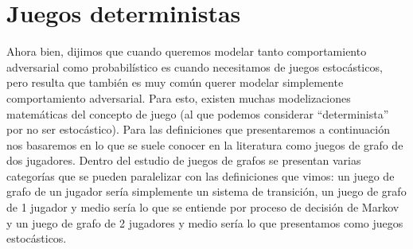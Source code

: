 







\section{Juegos deterministas}

Ahora bien, dijimos que cuando queremos modelar tanto comportamiento
adversarial como probabilístico es cuando necesitamos de juegos estocásticos,
pero resulta que también es muy común querer modelar simplemente comportamiento
adversarial. Para esto, existen muchas modelizaciones matemáticas del concepto
de juego (al que podemos considerar ``determinista'' por no ser estocástico).
Para las definiciones que presentaremos a continuación nos basaremos en lo que
se suele conocer en la literatura como juegos de grafo de dos jugadores. Dentro
del estudio de juegos de grafos se presentan varias categorías que se pueden
paralelizar con las definiciones que vimos: un juego de grafo de un jugador
sería simplemente un sistema de transición, un juego de grafo de 1 jugador y
medio sería lo que se entiende por proceso de decisión de Markov y un juego de
grafo de 2 jugadores y medio sería lo que presentamos como juegos estocásticos.

